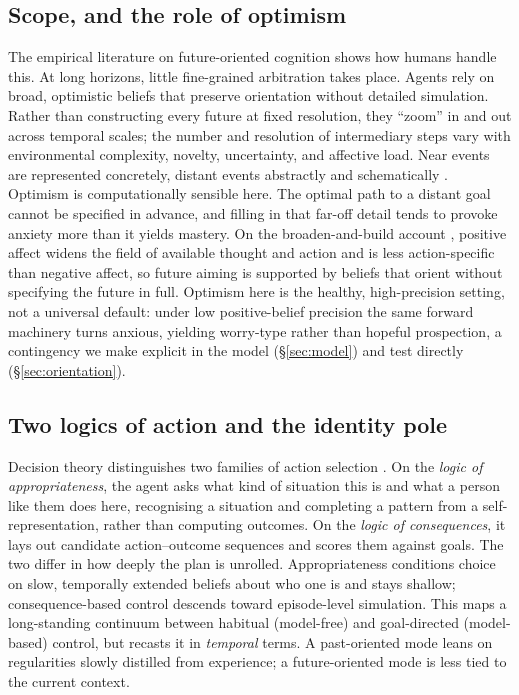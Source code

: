 \documentclass[11pt,a4paper]{article}
\begin{document}
\subsection{Scope, and the role of optimism}
The empirical literature on future-oriented cognition shows how humans handle this.
At long horizons, little fine-grained arbitration takes place. Agents rely on broad,
optimistic beliefs that preserve orientation without detailed simulation. Rather than
constructing every future at fixed resolution, they ``zoom'' in and out across
temporal scales; the number and resolution of intermediary steps vary with
environmental complexity, novelty, uncertainty, and affective load. Near events are
represented concretely, distant events abstractly and schematically
\citep{tropeliberman2010}. Optimism is computationally sensible here. The optimal
path to a distant goal cannot be specified in advance, and filling in that far-off
detail tends to provoke anxiety more than it yields mastery. On the broaden-and-build
account \citep{fredrickson2001}, positive affect widens the field of available thought and action and is less
action-specific than negative affect, so future aiming is supported by beliefs that
orient without specifying the future in full. Optimism here is the healthy,
high-precision setting, not a universal default: under low positive-belief
precision the same forward machinery turns anxious, yielding worry-type rather than
hopeful prospection, a contingency we make explicit in the model (\S\ref{sec:model}) and test directly
(\S\ref{sec:orientation}).

\subsection{Two logics of action and the identity pole}
Decision theory distinguishes two families of action selection \citep{march1994}. On
the \emph{logic of appropriateness}, the agent asks what kind of situation this is and what a person like
them does here, recognising a situation and completing a pattern from a
self-representation, rather than computing outcomes. On the \emph{logic of
consequences}, it lays out candidate action--outcome sequences and scores them against
goals. The two differ in how deeply the plan is unrolled. Appropriateness conditions
choice on slow, temporally extended beliefs about who one is and stays shallow;
consequence-based control descends toward episode-level simulation. This maps a
long-standing continuum between habitual (model-free) and goal-directed (model-based)
control, but recasts it in \emph{temporal} terms. A past-oriented mode leans on
regularities slowly distilled from experience; a future-oriented mode is less tied to
the current context.
\end{document}
